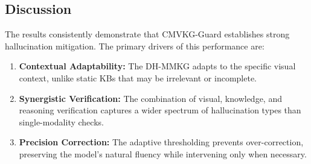 \subsection{Discussion}
The results consistently demonstrate that CMVKG-Guard establishes strong hallucination mitigation. The primary drivers of this performance are:
\begin{enumerate}
    \item \textbf{Contextual Adaptability:} The DH-MMKG adapts to the specific visual context, unlike static KBs that may be irrelevant or incomplete.
    \item \textbf{Synergistic Verification:} The combination of visual, knowledge, and reasoning verification captures a wider spectrum of hallucination types than single-modality checks.
    \item \textbf{Precision Correction:} The adaptive thresholding prevents over-correction, preserving the model's natural fluency while intervening only when necessary.
\end{enumerate}

